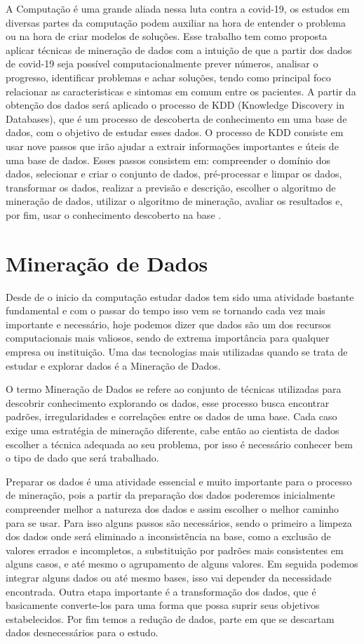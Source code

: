 \documentclass[tcc1]{uftex}
\begin{document}
A Computação é uma grande aliada nessa luta contra a covid-19, os estudos em diversas partes da computação podem auxiliar na hora de entender o problema ou na hora de criar modelos de soluções. Esse trabalho tem como proposta aplicar técnicas de mineração de dados com a intuição de que a partir dos dados de covid-19 seja possível computacionalmente prever números, analisar o progresso, identificar problemas e achar soluções, tendo como principal foco relacionar as caracteristicas e sintomas em comum entre os pacientes. A partir da obtenção dos dados será aplicado o processo de KDD (Knowledge Discovery in Databases), que é um processo de descoberta de conhecimento em uma base de dados, com o objetivo de estudar esses dados. O processo de KDD consiste em usar nove passos que irão ajudar a extrair informações importantes e úteis de uma base de dados. Esses passos consistem em: compreender o domínio dos dados, selecionar e criar o conjunto de dados, pré-processar e limpar os dados, transformar os dados, realizar a previsão e descrição, escolher o algoritmo de mineração de dados, utilizar o algoritmo de mineração, avaliar os resultados e, por fim, usar o conhecimento descoberto na base \cite{fayyad1996kdd}.

\chapter{Mineração de Dados}

Desde de o inicio da computação estudar dados tem sido uma atividade bastante fundamental e com o passar do tempo isso vem se tornando cada vez mais importante e necessário, hoje podemos dizer que dados são um dos recursos computacionais mais valiosos, sendo de extrema importância para qualquer empresa ou instituição. Uma das tecnologias mais utilizadas quando se trata de estudar e explorar dados é a Mineração de Dados. 

	O termo Mineração de Dados se refere ao conjunto de técnicas utilizadas para descobrir conhecimento explorando os dados, esse processo busca encontrar padrões, irregularidades e correlações entre os dados de uma base. Cada caso exige uma estratégia de mineração diferente, cabe então ao cientista de dados escolher a técnica adequada ao seu problema, por isso é necessário conhecer bem o tipo de dado que será trabalhado. 
	
Preparar os dados é uma atividade essencial e muito importante para o processo de mineração, pois a partir da preparação dos dados poderemos inicialmente compreender melhor a natureza dos dados e assim escolher o melhor caminho para se usar. Para isso alguns passos são necessários, sendo o primeiro a limpeza dos dados onde será eliminado a inconsistência na base, como a exclusão de valores errados e incompletos, a substituição por padrões mais consistentes em alguns casos, e até mesmo o agrupamento de alguns valores. Em seguida podemos integrar alguns dados ou até mesmo bases, isso vai depender da necessidade encontrada. Outra etapa importante é a transformação dos dados, que é basicamente converte-los para uma forma que possa suprir seus objetivos estabelecidos. Por fim temos a redução de dados, parte em que se descartam dados desnecessários para o estudo.\cite{camilo2009mineraccao}
\end{document}
